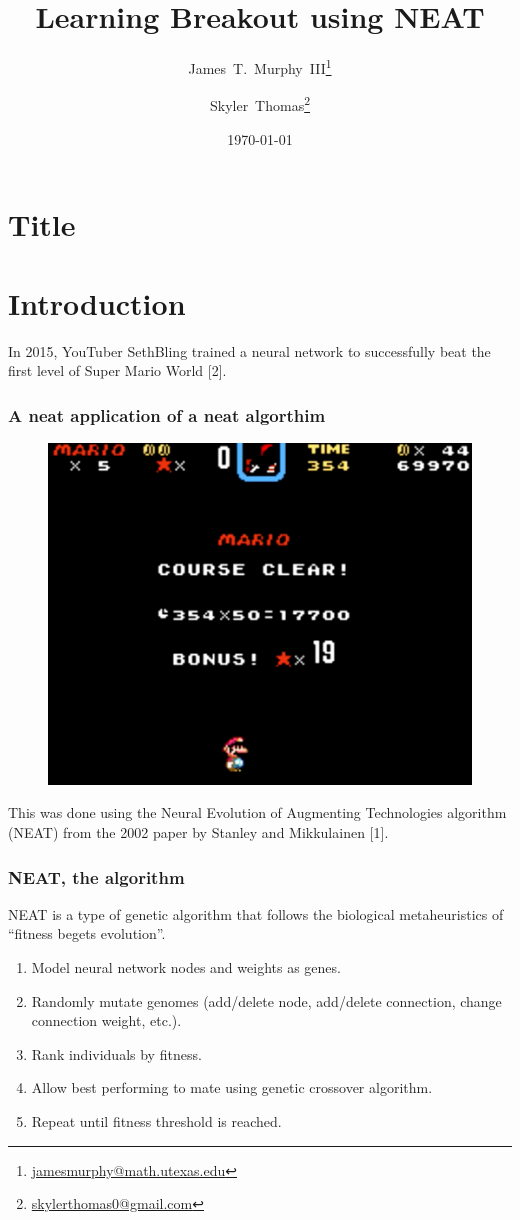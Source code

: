 \documentclass[t,pdflatex]{beamer}
\title{Learning Breakout using NEAT}
\author{James~T.~Murphy~III\thanks{\url{jamesmurphy@math.utexas.edu}}\and{}Skyler~Thomas\thanks{\url{skylerthomas0@gmail.com}}}
\institute{The University of Texas at Austin}
\date\today
\begin{document}
\section{Title}

    \begin{frame}

        \titlepage

    \end{frame}

\section{Introduction}
    \begin{frame}

        In 2015, YouTuber SethBling trained a neural network to successfully beat the first level of Super Mario World [2].
        \frametitle{A neat application of a neat algorthim}
        \begin{figure}
            \centering
            \includegraphics[width=.54 \textwidth]{mario.png}
        \end{figure}

        This was done using the Neural Evolution of Augmenting Technologies algorithm (NEAT) from the 2002 paper by Stanley and Mikkulainen [1].

    \end{frame}

    \begin{frame}

        \frametitle{NEAT, the algorithm}
        NEAT is a type of genetic algorithm that follows the biological metaheuristics of ``fitness begets evolution''.
        \begin{enumerate}
            \item Model neural network nodes and weights as genes.
            \item Randomly mutate genomes (add/delete node, add/delete connection, change connection weight,  etc.).
            \item Rank individuals by fitness.
            \item Allow best performing to mate using genetic crossover algorithm.
            \item Repeat until fitness threshold is reached.
        \end{enumerate}

    \end{frame}
\end{document}
